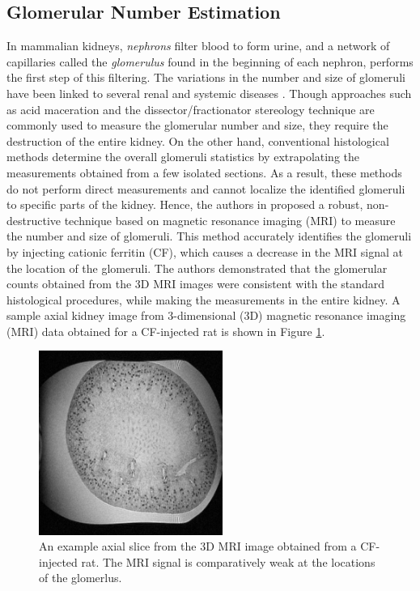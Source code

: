 \subsection{Glomerular Number Estimation}
In mammalian kidneys, \textit{nephrons} filter blood to form urine, and a network of capillaries called the \textit{glomerulus} found in the beginning of each nephron, performs the first step of this filtering. The variations in the number and size of glomeruli have been linked to several renal and systemic diseases \cite{brenner1988glomeruli, hoy2008nephron}. Though approaches such as acid maceration \cite{bonvalet1972compensatory} and the dissector/fractionator stereology technique \cite{bertram1992total} are commonly used to measure the glomerular number and size, they require the destruction of the entire kidney. On the other hand, conventional histological methods determine the overall glomeruli statistics by extrapolating the measurements obtained from a few isolated sections. As a result, these methods do not perform direct measurements and cannot localize the identified glomeruli to specific parts of the kidney. Hence, the authors in \cite{beeman2011measuring} proposed a robust, non-destructive technique based on magnetic resonance imaging (MRI) to measure the number and size of glomeruli. This method accurately identifies the glomeruli by injecting cationic ferritin (CF), which causes a decrease in the MRI signal at the location of the glomeruli. The authors demonstrated that the glomerular counts obtained from the 3D MRI images were consistent with the standard histological procedures, while making the measurements in the entire kidney. A sample axial kidney image from 3-dimensional (3D) magnetic resonance imaging (MRI) data obtained for a CF-injected rat is shown in Figure \ref{Fig:samp}.

\begin{figure}[t]
\begin{minipage}[b]{1.0\linewidth}
  \centering
  \includegraphics[width=6cm]{sample_kidney.png}
\end{minipage}
\caption{An example axial slice from the 3D MRI image obtained from a CF-injected rat. The MRI signal is comparatively weak at the locations of the glomerlus.}
\label{Fig:samp}
\end{figure}

